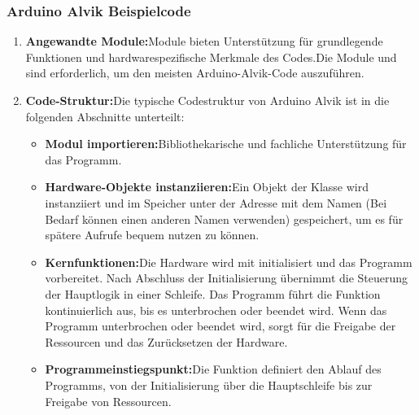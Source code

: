 \subsubsection{Arduino Alvik Beispielcode}
\begin{enumerate}
	\item \textbf{Angewandte Module:}Module bieten Unterstützung für grundlegende Funktionen und hardwarespezifische Merkmale des Codes.Die Module  und  sind erforderlich, um den meisten Arduino-Alvik-Code auszuführen.
	
	\item \textbf{Code-Struktur:}Die typische Codestruktur von Arduino Alvik ist in die folgenden Abschnitte unterteilt:
	\begin{itemize}
		\item \textbf{Modul importieren:}Bibliothekarische und fachliche Unterstützung für das Programm.
		\item \textbf{Hardware-Objekte instanziieren:}Ein Objekt der Klasse  wird instanziiert und im Speicher unter der Adresse mit dem Namen (Bei Bedarf können einen anderen Namen verwenden) gespeichert, um es für spätere Aufrufe bequem nutzen zu können.
		\item \textbf{Kernfunktionen:}Die Hardware wird mit  initialisiert und das Programm vorbereitet. Nach Abschluss der Initialisierung übernimmt  die Steuerung der Hauptlogik in einer Schleife. Das Programm führt die Funktion  kontinuierlich aus, bis es unterbrochen oder beendet wird. Wenn das Programm unterbrochen oder beendet wird, sorgt  für die Freigabe der Ressourcen und das Zurücksetzen der Hardware.
		\item \textbf{Programmeinstiegspunkt:}Die Funktion  definiert den Ablauf des Programms, von der Initialisierung über die Hauptschleife bis zur Freigabe von Ressourcen.
	\end{itemize}
	

\end{enumerate}
